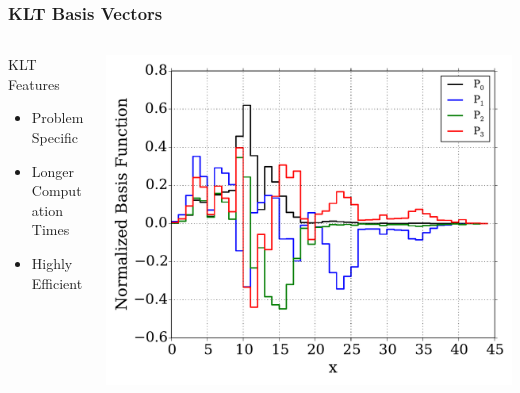 \documentclass[fleqn]{beamer}
\begin{document}
  \begin{frame}
      \frametitle{KLT Basis Vectors}
      \begin{columns}[T]
          \begin{column}{0.4\textwidth}
              \begin{block}{KLT Features}
                  \begin{itemize}
                      \item Problem Specific
                      \item Longer Computation Times
                      \item Highly Efficient
                  \end{itemize}
              \end{block}
          \end{column}
          \begin{column}{0.6\textwidth}
              \includegraphics[trim=.1cm .25cm .1cm .4cm, clip=true,
              totalheight=0.65\textheight]{Figures/KLT_basis}
          \end{column}
      \end{columns}
  \end{frame}
  
\end{document}
